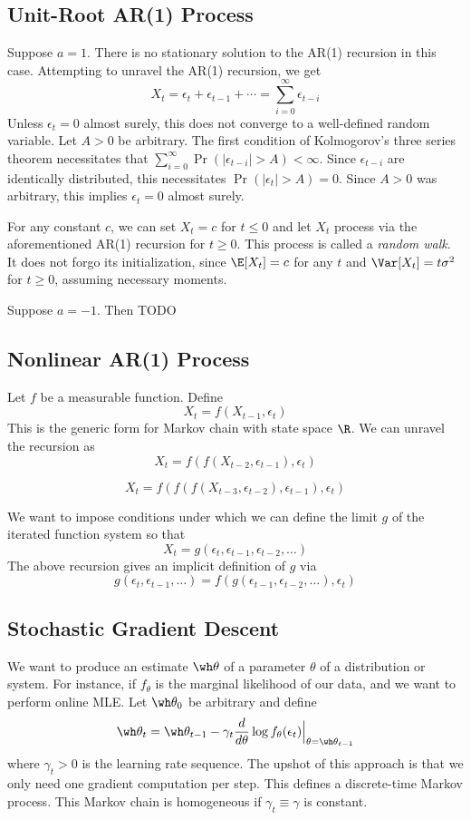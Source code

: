 \subsection*{Unit-Root AR(1) Process}
Suppose \(a = 1\). There is no stationary solution to the AR(1) recursion in this case. Attempting to unravel the AR(1) recursion, we get
\[X_t = \epsilon_t + \epsilon_{t-1} + \cdots = \sum_{i=0}^\infty \epsilon_{t-i}\]
Unless \(\epsilon_t = 0\) almost surely, this does not converge to a well-defined random variable. Let \(A > 0\) be arbitrary. The first condition of Kolmogorov's three series theorem necessitates that \(\sum_{i=0}^\infty \Pr(|\epsilon_{t-i}| > A) < \infty\). Since \(\epsilon_{t-i}\) are identically distributed, this necessitates \(\Pr(|\epsilon_t| > A) = 0\). Since \(A > 0\) was arbitrary, this implies \(\epsilon_t = 0\) almost surely.

For any constant \(c\), we can set \(X_t = c\) for \(t \leq 0\) and let \(X_t\) process via the aforementioned AR(1) recursion for \(t \geq 0\). This process is called a \emph{random walk}. It does not forgo its initialization, since \(\E[X_t] = c\) for any \(t\) and \(\Var[X_t] = t \sigma^2\) for \(t \geq 0\), assuming necessary moments.

Suppose \(a = -1\). Then TODO

\subsection*{Nonlinear AR(1) Process}
Let \(f\) be a measurable function. Define
\[X_t = f(X_{t-1}, \epsilon_t)\]
This is the generic form for Markov chain with state space \(\R\). We can unravel the recursion as
\[X_t = f(f(X_{t-2}, \epsilon_{t-1}), \epsilon_t)\]

\[X_t = f(f(f(X_{t-3}, \epsilon_{t-2}), \epsilon_{t-1}), \epsilon_t)\]

We want to impose conditions under which we can define the limit \(g\) of the iterated function system so that
\[X_t = g(\epsilon_t, \epsilon_{t-1}, \epsilon_{t-2}, \dots)\]
The above recursion gives an implicit definition of \(g\) via
\[g(\epsilon_t, \epsilon_{t-1}, \dots) = f(g(\epsilon_{t-1}, \epsilon_{t-2}, \dots), \epsilon_t)\]

\subsection*{Stochastic Gradient Descent}
We want to produce an estimate \(\wh\theta\) of a parameter \(\theta\) of a distribution or system. For instance, if \(f_\theta\) is the marginal likelihood of our data, and we want to perform online MLE. Let \(\wh\theta_0\) be arbitrary and define
\[\wh\theta_t = \wh\theta_{t-1} - \gamma_t \frac{d}{d\theta} \log f_\theta(\epsilon_t) \Big\vert_{\theta = \wh\theta_{t-1}}\]
where \(\gamma_t > 0\) is the learning rate sequence. The upshot of this approach is that we only need one gradient computation per step. This defines a discrete-time Markov process. This Markov chain is homogeneous if \(\gamma_t \equiv \gamma\) is constant.

